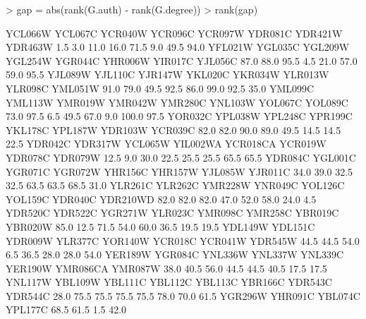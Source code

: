 \documentclass[a4paper]{article}
\begin{document}
\begin{Schunk}
\begin{Sinput}
> gap = abs(rank(G.auth) - rank(G.degree))
> rank(gap)
\end{Sinput}
\begin{Soutput}
 YCL066W  YCL067C  YCR040W  YCR096C  YCR097W  YDR081C  YDR421W  YDR463W 
     1.5      3.0     11.0     16.0     71.5      9.0     49.5     94.0 
 YFL021W  YGL035C  YGL209W  YGL254W  YGR044C  YHR006W  YIR017C  YJL056C 
    87.0     88.0     95.5      4.5     21.0     57.0     59.0     95.5 
 YJL089W  YJL110C  YJR147W  YKL020C  YKR034W  YLR013W  YLR098C  YML051W 
    91.0     79.0     49.5     92.5     86.0     99.0     92.5     35.0 
 YML099C  YML113W  YMR019W  YMR042W  YMR280C  YNL103W  YOL067C  YOL089C 
    73.0     97.5      6.5     49.5     67.0      9.0    100.0     97.5 
 YOR032C  YPL038W  YPL248C  YPR199C  YKL178C  YPL187W  YDR103W  YCR039C 
    82.0     82.0     90.0     89.0     49.5     14.5     14.5     22.5 
 YDR042C  YDR317W  YCL065W YIL002WA YCR018CA  YCR019W  YDR078C  YDR079W 
    12.5      9.0     30.0     22.5     25.5     25.5     65.5     65.5 
 YDR084C  YGL001C  YGR071C  YGR072W  YHR156C  YHR157W  YJL085W  YJR011C 
    34.0     39.0     32.5     32.5     63.5     63.5     68.5     31.0 
 YLR261C  YLR262C  YMR228W  YNR049C  YOL126C  YOL159C  YDR040C YDR210WD 
    82.0     82.0     82.0     47.0     52.0     58.0     24.0      4.5 
 YDR520C  YDR522C  YGR271W  YLR023C  YMR098C  YMR258C  YBR019C  YBR020W 
    85.0     12.5     71.5     54.0     60.0     36.5     19.5     19.5 
 YDL149W  YDL151C  YDR009W  YLR377C  YOR140W  YCR018C  YCR041W  YDR545W 
    44.5     44.5     54.0      6.5     36.5     28.0     28.0     54.0 
 YER189W  YGR084C  YNL336W  YNL337W  YNL339C  YER190W YMR086CA  YMR087W 
    38.0     40.5     56.0     44.5     44.5     40.5     17.5     17.5 
 YNL117W  YBL109W  YBL111C  YBL112C  YBL113C  YBR166C  YDR543C  YDR544C 
    28.0     75.5     75.5     75.5     75.5     78.0     70.0     61.5 
 YGR296W  YHR091C  YBL074C  YPL177C 
    68.5     61.5      1.5     42.0 
\end{Soutput}
\end{Schunk}
\end{document}
